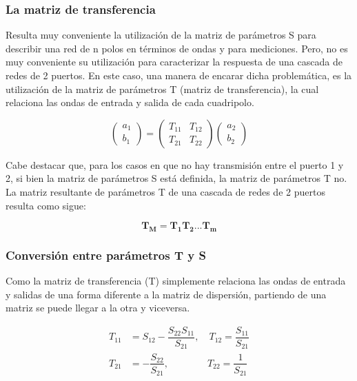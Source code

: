 \subsubsection{La matriz de transferencia} \label{ssec:transMatrix}

Resulta muy conveniente la utilización de la matriz de parámetros S para describir una red de n polos en términos de ondas y
para mediciones. Pero, no es muy conveniente su utilización para caracterizar la respuesta de una cascada de redes de 2
puertos. En este caso, una manera de encarar dicha problemática, es la utilización de la matriz de parámetros T (matriz
de transferencia), la cual relaciona las ondas de entrada y salida de cada cuadripolo.

\begin{equation}
\begin{pmatrix} a_1\\b_1 \end{pmatrix} = \begin{pmatrix} T_{11} & T_{12}\\T_{21} & T_{22} \end{pmatrix}
\begin{pmatrix} a_2\\b_2 \end{pmatrix}
\end{equation}

Cabe destacar que, para los casos en que no hay transmisión entre el puerto 1 y 2, si bien la matriz de parámetros S está definida,
la matriz de parámetros T no. La matriz resultante de parámetros T de una cascada de redes de 2 puertos resulta como sigue:

\begin{equation}
\mathbf{T_M=T_1T_2...T_m}
\label{eq:cascade}
\end{equation}

\subsubsection{Conversión entre parámetros T y S} \label{ssec:conversion}

Como la matriz de transferencia (T) simplemente relaciona las ondas de entrada y salidas de una forma diferente a la matriz de
dispersión, partiendo de una matriz se puede llegar a la otra y viceversa.

\begin{equation}
	\begin{aligned}
		T_{11} &= S_{12} - \dfrac{S_{22}S_{11}}{S_{21}},\quad T_{12} = \dfrac{S_{11}}{S_{21}} \\
		T_{21} &= - \dfrac{S_{22}}{S_{21}},\qquad\qquad T_{22} = \dfrac{1}{S_{21}}
	\end{aligned}
	\label{eq:s2t}
\end{equation}


